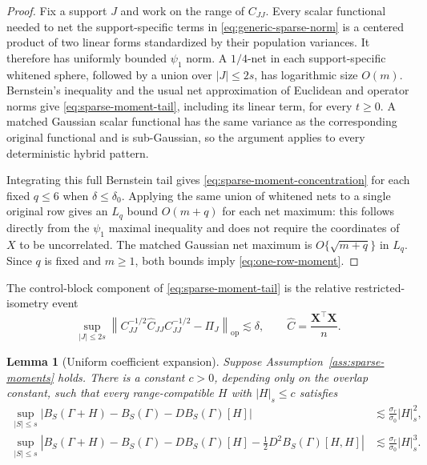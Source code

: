 \documentclass[a4paper,11pt,english]{article}
\newtheorem{lemma}[theorem]{Lemma}
\newcommand{\norm}[1]{\left\lVert #1\right\rVert}
\begin{document}
\begin{proof}
Fix a support $J$ and work on the range of $C_{JJ}$.  Every scalar
functional needed to net the support-specific terms in
\eqref{eq:generic-sparse-norm} is a centered product of two linear forms
standardized by their population variances.  It therefore has uniformly
bounded $\psi_1$ norm.  A $1/4$-net in each support-specific whitened
sphere, followed by a union over $|J|\le2s$, has logarithmic size
$O(m)$.  Bernstein's inequality and the usual net approximation of
Euclidean and operator norms give \eqref{eq:sparse-moment-tail}, including
its linear term, for every $t\ge0$.  A matched Gaussian scalar functional
has the same variance as the corresponding original functional and is
sub-Gaussian, so the argument applies to every deterministic hybrid
pattern.

Integrating this full Bernstein tail gives
\eqref{eq:sparse-moment-concentration} for each fixed $q\le6$ when
$\delta\le\delta_0$.  Applying the same union of whitened nets to a single original
row gives an $L_q$ bound $O(m+q)$ for each net maximum: this follows
directly from the $\psi_1$ maximal inequality and does not require the
coordinates of $X$ to be uncorrelated.  The matched Gaussian net maximum
is $O\{\sqrt{m+q}\}$ in $L_q$.  Since $q$ is fixed and $m\ge1$, both
bounds imply \eqref{eq:one-row-moment}.
\end{proof}

The control-block component of \eqref{eq:sparse-moment-tail} is the
relative restricted-isometry event
\begin{equation}\label{eq:relative-rip}
        \sup_{|J|\le2s}
        \norm{C_{JJ}^{-1/2}\hat C_{JJ}C_{JJ}^{-1/2}
        -\Pi_J}_{\mathrm{op}}
        \lesssim\delta,
        \qquad \hat C=\frac{\mathbf X^\top\mathbf X}{n}.
\end{equation}

\begin{lemma}[Uniform coefficient expansion]\label{lem:uniform-expansion}
Suppose Assumption~\ref{ass:sparse-moments} holds.  There is a constant
$c>0$, depending only on the overlap constant, such that every
range-compatible $H$ with $|H|_s\le c$ satisfies
\begin{align}
\sup_{|S|\le s}
\left|B_S(\Gamma+H)-B_S(\Gamma)-DB_S(\Gamma)[H]\right|
&\lesssim \frac{\sigma_r}{\sigma_0}|H|_s^2,
\label{eq:first-order-remainder}\\
\sup_{|S|\le s}
\left|B_S(\Gamma+H)-B_S(\Gamma)-DB_S(\Gamma)[H]
-\frac12D^2B_S(\Gamma)[H,H]\right|
&\lesssim \frac{\sigma_r}{\sigma_0}|H|_s^3.
\label{eq:second-order-remainder}
\end{align}
\end{lemma}
\end{document}
